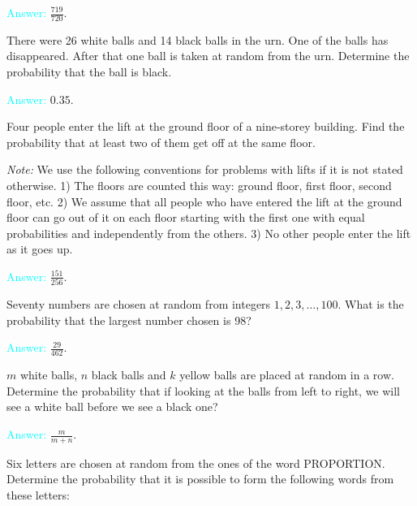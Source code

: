 \documentclass[14pt]{exam}
\begin{document}
\begin{questions}
		\textcolor{cyan}{Answer:} $\frac{719}{720}$.
		
		\question
		There were 26 white balls and 14 black balls in the urn. One of the balls has disappeared. After that one ball is taken at random from the urn. Determine the probability that the ball is black.
		
		\textcolor{cyan}{Answer:} $0.35$.
		
		\question
		Four people enter the lift at the ground floor of a nine-storey building. Find the probability that at least two of them get off at the same floor.
		
		\textit{Note:} We use the following conventions for problems with lifts if it is not stated otherwise. 1) The floors are counted this way: ground floor, first floor, second floor, etc. 2) We assume that all people who have entered the lift at the ground floor can go out of it on each floor starting with the first one with equal probabilities and independently from the others. 3) No other people enter the lift as it goes up.
		
		\textcolor{cyan}{Answer:} $\frac{151}{256}$.
		
		\question
		Seventy numbers are chosen at random from integers $1, 2, 3, \dots, 100$. What is the probability that the largest number chosen is 98?
		
		\textcolor{cyan}{Answer:} $\frac{29}{462}$.
		
		\question
		$m$ white balls, $n$ black balls and $k$ yellow balls are placed at random in a row. Determine the probability that if looking at the balls from left to right, we will see a white ball before we see a black one?
		
		\textcolor{cyan}{Answer:} $\frac{m}{m+n}$.
		
		\question
		Six letters are chosen at random from the ones of the word PROPORTION. Determine the probability that it is possible to form the following words from these letters:
		
		

\end{questions}
\end{document}
